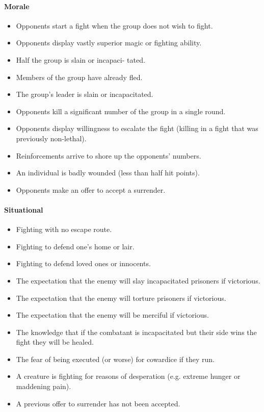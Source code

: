 \begin{multicols}{2}



\paragraph{Morale} 

\begin{itemize}
    \item Opponents start a fight when the group does not wish to fight.
    \item Opponents display vastly superior magic or fighting ability.
    \item Half the group is slain or incapaci- tated.
    \item Members of the group have already fled.
    \item The group’s leader is slain or incapacitated.
    \item Opponents kill a significant number of the group in a single round.
    \item Opponents display willingness to escalate the fight (killing in a fight that was previously non-lethal).
    \item Reinforcements arrive to shore up the opponents’ numbers.
    \item An individual is badly wounded (less than half hit points).
    \item Opponents make an offer to accept a surrender.
\end{itemize}

\paragraph{Situational}

\begin{itemize}
    \item Fighting with no escape route.
    \item Fighting to defend one’s home or lair.
    \item Fighting to defend loved ones or innocents.
    \item The expectation that the enemy will slay incapacitated prisoners if victorious.
    \item The expectation that the enemy will torture prisoners if victorious.
    \item The expectation that the enemy will be merciful if victorious.
    \item The knowledge that if the combatant is incapacitated but their side wins the fight they will be healed.
    \item The fear of being executed (or worse) for cowardice if they run.
    \item A creature is fighting for reasons of desperation (e.g. extreme hunger or maddening pain).
    \item A previous offer to surrender has not been accepted.
\end{itemize}
\end{multicols}

